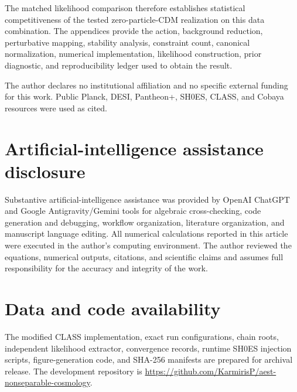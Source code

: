 \documentclass[aps,prd,twocolumn,superscriptaddress,nofootinbib,longbibliography,floatfix]{revtex4-2}
\begin{document}
The matched likelihood comparison therefore establishes statistical competitiveness of the tested zero-particle-CDM realization on this data combination. The appendices provide the action, background reduction, perturbative mapping, stability analysis, constraint count, canonical normalization, numerical implementation, likelihood construction, prior diagnostic, and reproducibility ledger used to obtain the result.

\begin{acknowledgments}
The author declares no institutional affiliation and no specific external funding for this work. Public Planck, DESI, Pantheon+, SH0ES, CLASS, and Cobaya resources were used as cited.
\end{acknowledgments}

\section*{Artificial-intelligence assistance disclosure}
Substantive artificial-intelligence assistance was provided by OpenAI ChatGPT and Google Antigravity/Gemini tools for algebraic cross-checking, code generation and debugging, workflow organization, literature organization, and manuscript language editing. All numerical calculations reported in this article were executed in the author's computing environment. The author reviewed the equations, numerical outputs, citations, and scientific claims and assumes full responsibility for the accuracy and integrity of the work.

\section*{Data and code availability}
The modified CLASS implementation, exact run configurations, chain roots, independent likelihood extractor, convergence records, runtime SH0ES injection scripts, figure-generation code, and SHA-256 manifests are prepared for archival release. The development repository is \url{https://github.com/KarmirisP/aest-nonseparable-cosmology}.

\appendix
\end{document}
